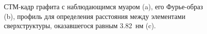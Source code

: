 \documentclass[a4paper, 12pt]{article}
\begin{document}
	\begin{figure}[H]
		\centering
		\caption{СТМ-кадр графита с наблюдающимся муаром (a), его Фурье-образ (b), профиль для определения расстояния между элементами сверхструктуры, оказавшегося равным 3.82~нм (c).}
		\label{fig:2_muar}
	\end{figure}
\end{document}
